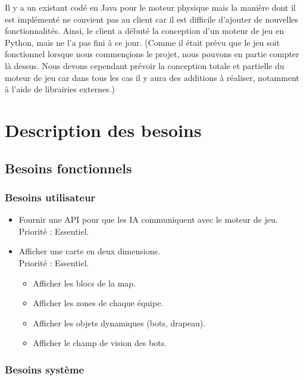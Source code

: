 \documentclass[french]{article}
\begin{document}
Il y a un existant codé en Java pour le moteur physique mais la manière dont il est implémenté ne convient pas au client car il est difficile d'ajouter de nouvelles fonctionnalités. Ainsi, le client a débuté la conception d'un moteur de jeu en Python, mais ne l'a pas fini à ce jour. \newline
(Comme il était prévu que le jeu soit fonctionnel lorsque nous commençions le projet, nous pouvons en partie compter là dessus. Nous devons cependant prévoir la conception totale et partielle du moteur de jeu car dans tous les cas il y aura des additions à réaliser, notamment à l'aide de librairies externes.)

\section{Description des besoins}

\subsection{Besoins fonctionnels}
\subsubsection{Besoins utilisateur}
    \begin{itemize}
        \item Fournir une API pour que les IA communiquent avec le moteur de jeu. \\
                Priorité : Essentiel.\\

        \item Afficher une carte en deux dimensions. \\
            Priorité : Essentiel.
            \begin{itemize}
                \item Afficher les blocs de la map.
                \item Afficher les zones de chaque équipe.
                \item Afficher les objets dynamiques (bots, drapeau).
                \item Afficher le champ de vision des bots.
            \end{itemize}

    \end{itemize}

\subsubsection{Besoins système}
    
\end{document}
